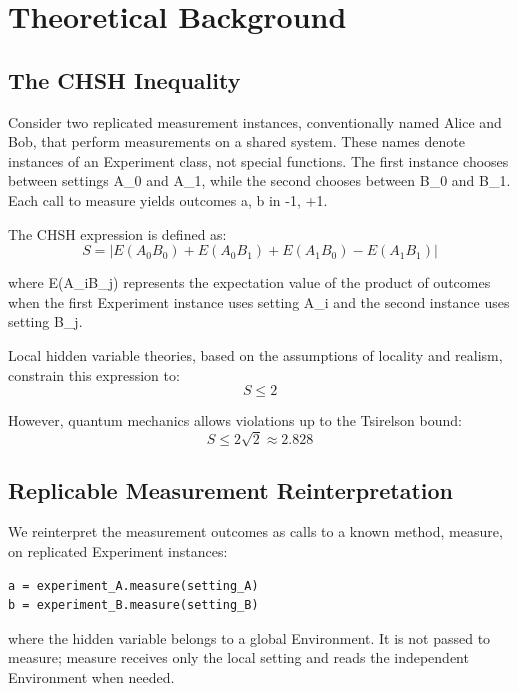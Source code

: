 \documentclass[11pt,a4paper]{article}
\begin{document}
\section{Theoretical Background}

\subsection{The CHSH Inequality}

Consider two replicated measurement instances, conventionally named Alice and Bob, that perform measurements on a shared system. These names denote instances of an Experiment class, not special functions. The first instance chooses between settings A_0 and A_1, while the second chooses between B_0 and B_1. Each call to measure yields outcomes a, b in {-1, +1}.

The CHSH expression is defined as:
\begin{equation}
S = |E(A_0B_0) + E(A_0B_1) + E(A_1B_0) - E(A_1B_1)|
\label{eq:chsh}
\end{equation}

where E(A_iB_j) represents the expectation value of the product of outcomes when the first Experiment instance uses setting A_i and the second instance uses setting B_j.

Local hidden variable theories, based on the assumptions of locality and realism, constrain this expression to:
\begin{equation}
S \leq 2
\label{eq:classical_bound}
\end{equation}

However, quantum mechanics allows violations up to the Tsirelson bound:
\begin{equation}
S \leq 2\sqrt{2} \approx 2.828
\label{eq:tsirelson_bound}
\end{equation}

\subsection{Replicable Measurement Reinterpretation}

We reinterpret the measurement outcomes as calls to a known method, measure, on replicated Experiment instances:
\begin{verbatim}
a = experiment_A.measure(setting_A)
b = experiment_B.measure(setting_B)
\end{verbatim}

where the hidden variable belongs to a global Environment. It is not passed to measure; measure receives only the local setting and reads the independent Environment when needed.
\end{document}
